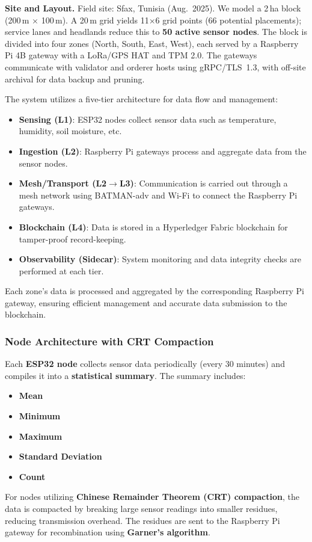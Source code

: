 \documentclass[12pt,onecolumn]{IEEEtran} %
\begin{document}
\noindent\textbf{Site and Layout.}
Field site: Sfax, Tunisia (Aug.\ 2025). We model a 2\,ha block (200\,m $\times$ 100\,m). A 20\,m grid yields 11$\times$6 grid points (66 potential placements); service lanes and headlands reduce this to \textbf{50 active sensor nodes}. The block is divided into four zones (North, South, East, West), each served by a Raspberry Pi 4B gateway with a LoRa/GPS HAT and TPM 2.0. The gateways communicate with validator and orderer hosts using gRPC/TLS~1.3, with off-site archival for data backup and pruning.

The system utilizes a five-tier architecture for data flow and management:

\begin{itemize}
    \item \textbf{Sensing (L1)}: ESP32 nodes collect sensor data such as temperature, humidity, soil moisture, etc.
    \item \textbf{Ingestion (L2)}: Raspberry Pi gateways process and aggregate data from the sensor nodes.
    \item \textbf{Mesh/Transport (L2$\to$L3)}: Communication is carried out through a mesh network using BATMAN-adv and Wi-Fi to connect the Raspberry Pi gateways.
    \item \textbf{Blockchain (L4)}: Data is stored in a Hyperledger Fabric blockchain for tamper-proof record-keeping.
    \item \textbf{Observability (Sidecar)}: System monitoring and data integrity checks are performed at each tier.
\end{itemize}

Each zone's data is processed and aggregated by the corresponding Raspberry Pi gateway, ensuring efficient management and accurate data submission to the blockchain.

\subsubsection{Node Architecture with CRT Compaction}

Each \textbf{ESP32 node} collects sensor data periodically (every 30 minutes) and compiles it into a \textbf{statistical summary}. The summary includes:
\begin{itemize}
    \item \textbf{Mean}
    \item \textbf{Minimum}
    \item \textbf{Maximum}
    \item \textbf{Standard Deviation}
    \item \textbf{Count}
\end{itemize}
For nodes utilizing \textbf{Chinese Remainder Theorem (CRT) compaction}, the data is compacted by breaking large sensor readings into smaller residues, reducing transmission overhead. The residues are sent to the Raspberry Pi gateway for recombination using \textbf{Garner’s algorithm}.
\end{document}
